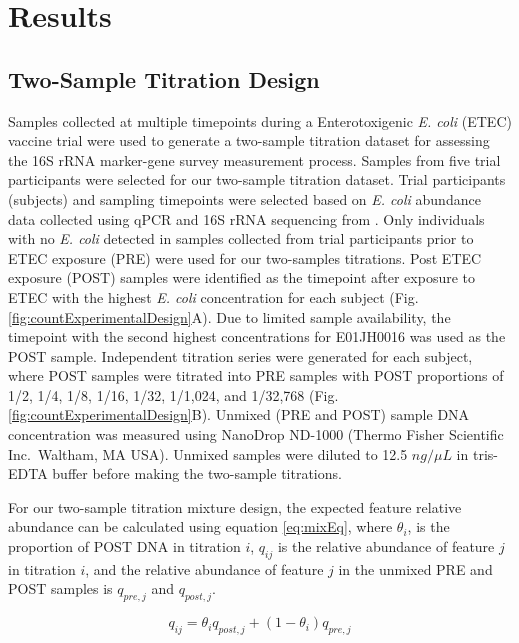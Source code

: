 \documentclass{bmcart}
\begin{document}
\section*{Results}

\subsection*{Two-Sample Titration Design}

Samples collected at multiple timepoints during a Enterotoxigenic
\emph{E. coli} (ETEC) vaccine trial \cite{harro2011refinement} were
used to generate a two-sample titration dataset for assessing the 16S
rRNA marker-gene survey measurement process. Samples from five trial
participants were selected for our two-sample titration dataset. Trial
participants (subjects) and sampling timepoints were selected based on
\emph{E. coli} abundance data collected using qPCR and 16S rRNA
sequencing from \cite{pop2016individual}. Only individuals with no
\emph{E. coli} detected in samples collected from trial participants
prior to ETEC exposure (PRE) were used for our two-samples titrations.
Post ETEC exposure (POST) samples were identified as the timepoint after
exposure to ETEC with the highest \emph{E. coli} concentration for each
subject (Fig. \ref{fig:countExperimentalDesign}A). Due to limited sample
availability, the timepoint with the second highest concentrations for
E01JH0016 was used as the POST sample. Independent titration series were
generated for each subject, where POST samples were titrated into PRE
samples with POST proportions of 1/2, 1/4, 1/8, 1/16, 1/32, 1/1,024, and
1/32,768 (Fig. \ref{fig:countExperimentalDesign}B). Unmixed (PRE and
POST) sample DNA concentration was measured using NanoDrop ND-1000
(Thermo Fisher Scientific Inc.~Waltham, MA USA). Unmixed samples were
diluted to 12.5 \(ng/\mu L\) in tris-EDTA buffer before making the
two-sample titrations.

For our two-sample titration mixture design, the expected feature
relative abundance can be calculated using equation \eqref{eq:mixEq},
where \(\theta_i\), is the proportion of POST DNA in titration \(i\),
\(q_{ij}\) is the relative abundance of feature \(j\) in titration
\(i\), and the relative abundance of feature \(j\) in the unmixed PRE
and POST samples is \(q_{pre,j}\) and \(q_{post,j}\).

\begin{equation}
  q_{ij} = \theta_i q_{post,j} + (1 - \theta_i) q_{pre,j}
  \label{eq:mixEq}
\end{equation}
\end{document}
